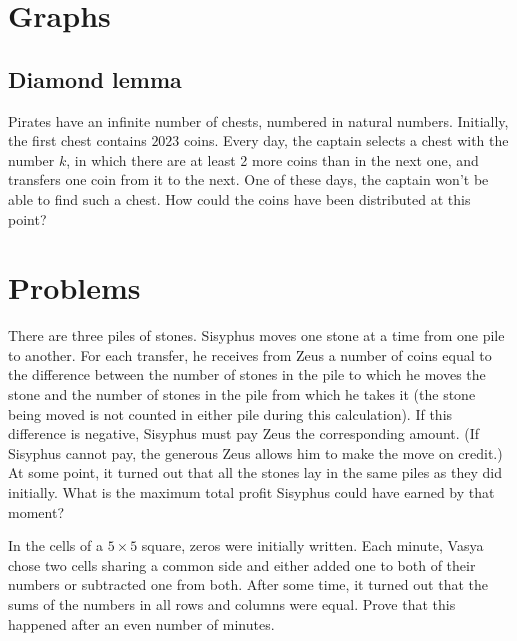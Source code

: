 \section{Graphs}

\subsection{Diamond lemma}

\begin{example}
    Pirates have an infinite number of chests, numbered in natural numbers. Initially, the first chest contains $2023$ coins. Every day, the captain selects a chest with the number $k$, in which there are at least 2 more coins than in the next one, and transfers one coin from it to the next. One of these days, the captain won't be able to find such a chest. How could the coins have been distributed at this point?
\end{example}

\section{Problems}

\begin{problem}[Russia 1995]
    There are three piles of stones. Sisyphus moves one stone at a time from one pile to another. For each transfer, he receives from Zeus a number of coins equal to the difference between the number of stones in the pile to which he moves the stone and the number of stones in the pile from which he takes it (the stone being moved is not counted in either pile during this calculation). If this difference is negative, Sisyphus must pay Zeus the corresponding amount. (If Sisyphus cannot pay, the generous Zeus allows him to make the move on credit.) At some point, it turned out that all the stones lay in the same piles as they did initially. What is the maximum total profit Sisyphus could have earned by that moment?
\end{problem}

\begin{problem}[Russia 2008]
    In the cells of a $5 \times 5$ square, zeros were initially written. Each minute, Vasya chose two cells sharing a common side and either added one to both of their numbers or subtracted one from both. After some time, it turned out that the sums of the numbers in all rows and columns were equal. Prove that this happened after an even number of minutes.
\end{problem}

